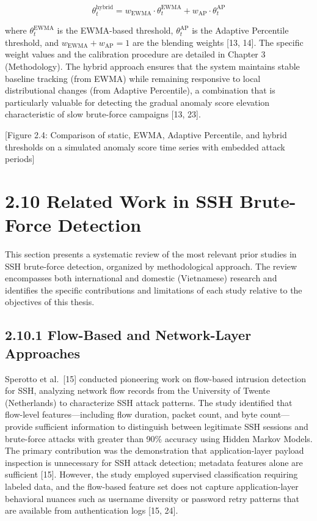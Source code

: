 \documentclass[
  a4paper]{report}
\begin{document}
\[\theta_t^{\text{hybrid}} = w_{\text{EWMA}} \cdot \theta_t^{\text{EWMA}} + w_{\text{AP}} \cdot \theta_t^{\text{AP}}\]

where \(\theta_t^{\text{EWMA}}\) is the EWMA-based threshold,
\(\theta_t^{\text{AP}}\) is the Adaptive Percentile threshold, and
\(w_{\text{EWMA}} + w_{\text{AP}} = 1\) are the blending weights {[}13,
14{]}. The specific weight values and the calibration procedure are
detailed in Chapter 3 (Methodology). The hybrid approach ensures that
the system maintains stable baseline tracking (from EWMA) while
remaining responsive to local distributional changes (from Adaptive
Percentile), a combination that is particularly valuable for detecting
the gradual anomaly score elevation characteristic of slow brute-force
campaigns {[}13, 23{]}.

{[}Figure 2.4: Comparison of static, EWMA, Adaptive Percentile, and
hybrid thresholds on a simulated anomaly score time series with embedded
attack periods{]}

\section{2.10 Related Work in SSH Brute-Force
Detection}\label{related-work-in-ssh-brute-force-detection}

This section presents a systematic review of the most relevant prior
studies in SSH brute-force detection, organized by methodological
approach. The review encompasses both international and domestic
(Vietnamese) research and identifies the specific contributions and
limitations of each study relative to the objectives of this thesis.

\subsection{2.10.1 Flow-Based and Network-Layer
Approaches}\label{flow-based-and-network-layer-approaches}

Sperotto et al.~{[}15{]} conducted pioneering work on flow-based
intrusion detection for SSH, analyzing network flow records from the
University of Twente (Netherlands) to characterize SSH attack patterns.
The study identified that flow-level features---including flow duration,
packet count, and byte count---provide sufficient information to
distinguish between legitimate SSH sessions and brute-force attacks with
greater than 90\% accuracy using Hidden Markov Models. The primary
contribution was the demonstration that application-layer payload
inspection is unnecessary for SSH attack detection; metadata features
alone are sufficient {[}15{]}. However, the study employed supervised
classification requiring labeled data, and the flow-based feature set
does not capture application-layer behavioral nuances such as username
diversity or password retry patterns that are available from
authentication logs {[}15, 24{]}.
\end{document}
